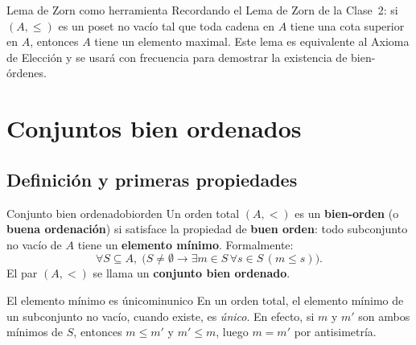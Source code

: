 \begin{ejemplo}{Lema de Zorn como herramienta}{}
Recordando el Lema de Zorn de la Clase~2: si $(A, \leq)$ es un poset no vacío tal que toda cadena en $A$ tiene una cota superior en $A$, entonces $A$ tiene un elemento maximal. Este lema es equivalente al Axioma de Elección y se usará con frecuencia para demostrar la existencia de bien-órdenes.
\end{ejemplo}

\section{Conjuntos bien ordenados}

\subsection{Definición y primeras propiedades}

\begin{definicion}{Conjunto bien ordenado}{biorden}
Un orden total $(A, <)$ es un \textbf{bien-orden} (o \textbf{buena ordenación}) si satisface la propiedad de \textbf{buen orden}: todo subconjunto no vacío de $A$ tiene un \textbf{elemento mínimo}. Formalmente:
\[
  \forall S \subseteq A,\; \bigl(S \neq \emptyset \to \exists m \in S\,\forall s \in S\,(m \leq s)\bigr).
\]
El par $(A, <)$ se llama un \textbf{conjunto bien ordenado}.
\end{definicion}

\begin{observacion}{El elemento mínimo es único}{minunico}
En un orden total, el elemento mínimo de un subconjunto no vacío, cuando existe, es \emph{único}. En efecto, si $m$ y $m'$ son ambos mínimos de $S$, entonces $m \leq m'$ y $m' \leq m$, luego $m = m'$ por antisimetría.
\end{observacion}

